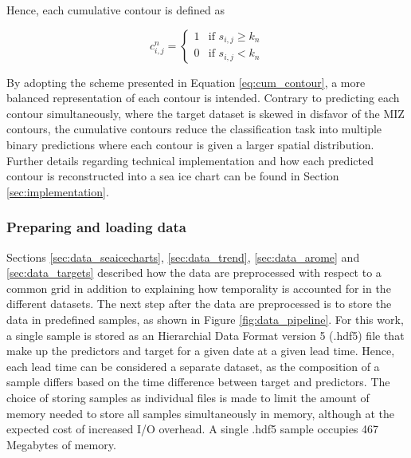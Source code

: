 \documentclass[../main/thesis]{subfiles}
\begin{document}
Hence, each cumulative contour is defined as

\begin{equation}
    \label{eq:cum_contour}
    c_{i,j}^n = \begin{cases}
        1 & \text{if } s_{i,j} \geq k_n \\
        0 & \text{if } s_{i,j} < k_n
    \end{cases}
\end{equation}

By adopting the scheme presented in Equation \ref{eq:cum_contour}, a more balanced representation of each contour is intended. Contrary to predicting each contour simultaneously, where the target dataset is skewed in disfavor of the MIZ contours, the cumulative contours reduce the classification task into multiple binary predictions where each contour is given a larger spatial distribution. Further details regarding technical implementation and how each predicted contour is reconstructed into a sea ice chart can be found in Section \ref{sec:implementation}.

\subsubsection{Preparing and loading data}
\label{sec:dataloader}
Sections \ref{sec:data_seaicecharts}, \ref{sec:data_trend}, \ref{sec:data_arome} and \ref{sec:data_targets} described how the data are preprocessed with respect to a common grid in addition to explaining how temporality is accounted for in the different datasets. The next step after the data are preprocessed is to store the data in predefined samples, as shown in Figure \ref{fig:data_pipeline}. For this work, a single sample is stored as an Hierarchial Data Format version 5 (.hdf5) file that make up the predictors and target for a given date at a given lead time. Hence, each lead time can be considered a separate dataset, as the composition of a sample differs based on the time difference between target and predictors. The choice of storing samples as individual files is made to limit the amount of memory needed to store all samples simultaneously in memory, although at the expected cost of increased I/O overhead. A single .hdf5 sample occupies 467 Megabytes of memory.
\end{document}
